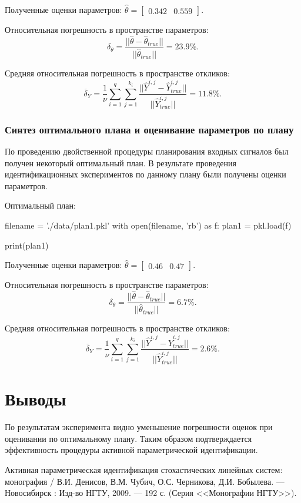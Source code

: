 \documentclass[a4paper,14pt]{extarticle}
\renewcommand{\baselinestretch}{1.5}
\begin{document}
Полученные оценки параметров:
$\hat{\theta} = \begin{bmatrix} 0.342 & 0.559 \end{bmatrix}$.

\newcommand{\rtol}[2]{\frac{||\hat{#1}#2 -
{\hat{#1}#2_{true}}||}{||\hat{#1}#2_{true}||}}

Относительная погрешность в пространстве параметров:
\[
	\delta_{\theta} = \rtol{\theta}{} = 23.9\%.
\]

Средняя относительная погрешность в пространстве откликов:
\[
	\overline{\delta}_Y = \frac{1}{\nu}
		\sum\limits_{i=1}^{q}\sum\limits_{j=1}^{k_i} \rtol{Y}{^{i,j}} = 11.8 \%.
\]

\subsubsection{Синтез оптимального плана и оценивание параметров по плану}

По проведению двойственной процедуры планирования входных сигналов был получен
некоторый оптимальный план. В результате проведения идентификационных экспериментов по
данному плану были получены оценки параметров.

Оптимальный план:

\begin{pycode}
filename = './data/plan1.pkl'
with open(filename, 'rb') as f:
    plan1 = pkl.load(f)

print(plan1)
\end{pycode}

Полученные оценки параметров:
$\hat{\theta} = \begin{bmatrix} 0.46 & 0.47 \end{bmatrix}$.

Относительная погрешность в пространстве параметров:
\[
	\delta_{\theta} = \rtol{\theta}{} = 6.7\%.
\]

Средняя относительная погрешность в пространстве откликов:
\[
	\overline{\delta}_Y = \frac{1}{\nu}
		\sum\limits_{i=1}^{q}\sum\limits_{j=1}^{k_i} \rtol{Y}{^{i,j}} = 2.6 \%.
\]

\section{Выводы}

По результатам эксперимента видно уменьшение погрешности оценок при оценивании
по оптимальному плану. Таким образом подтверждается эффективность процедуры
активной параметрической идентификации.

\begin{thebibliography}{9}

\begin{sloppypar}

 Активная параметрическая идентификация стохастических линейных
  систем: монография / В.И. Денисов, В.М. Чубич, О.С. Черникова, Д.И. Бобылева.
    --- Новосибирск : Изд-во НГТУ, 2009. --- 192 с.
    (Серия <<Монографии НГТУ>>).

\end{sloppypar}

\end{thebibliography}

\renewcommand{\baselinestretch}{1}
\end{document}
